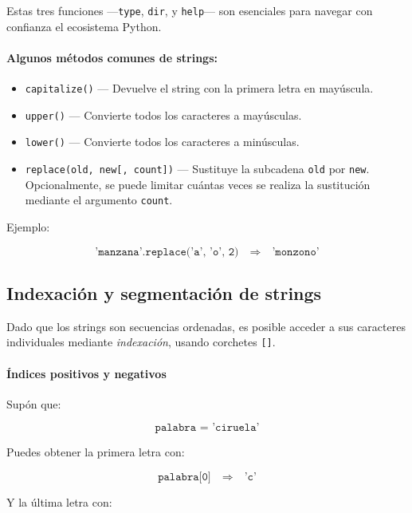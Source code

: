 \documentclass{article}
\theoremstyle{nonumberplain}
\begin{document}
Estas tres funciones —\texttt{type}, \texttt{dir}, y \texttt{help}— son esenciales para navegar con confianza el ecosistema Python.

\paragraph{Algunos métodos comunes de strings:}

\begin{itemize}
    \item \texttt{capitalize()} — Devuelve el string con la primera letra en mayúscula. \\
    \item \texttt{upper()} — Convierte todos los caracteres a mayúsculas. \\
    \item \texttt{lower()} — Convierte todos los caracteres a minúsculas. \\
    \item \texttt{replace(old, new[, count])} — Sustituye la subcadena \texttt{old} por \texttt{new}. Opcionalmente, se puede limitar cuántas veces se realiza la sustitución mediante el argumento \texttt{count}. \\
\end{itemize}

Ejemplo:

\[
\texttt{'manzana'.replace('a', 'o', 2)} \quad \Rightarrow \quad \texttt{'monzono'}
\]



\subsection*{Indexación y segmentación de strings}

Dado que los strings son secuencias ordenadas, es posible acceder a sus caracteres individuales mediante \textit{indexación}, usando corchetes \texttt{[]}.

\paragraph{Índices positivos y negativos}

Supón que:

\[
\texttt{palabra = 'ciruela'}
\]

Puedes obtener la primera letra con:

\[
\texttt{palabra[0]} \quad \Rightarrow \quad \texttt{'c'}
\]

Y la última letra con:
\end{document}
